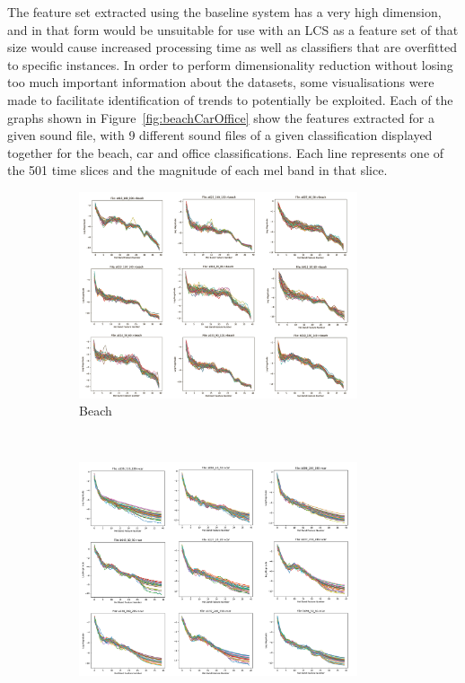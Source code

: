 \documentclass[11pt]{article}
\begin{document}
The feature set extracted using the baseline system has a very high dimension, and in that form would be unsuitable for use with an LCS as a feature set of that size would cause increased processing time as well as classifiers that are overfitted to specific instances. In order to perform dimensionality reduction without losing too much important information about the datasets, some visualisations were made to facilitate identification of trends to potentially be exploited. Each of the graphs shown in Figure~\ref{fig:beachCarOffice} show the features extracted for a given sound file, with 9 different sound files of a given classification displayed together for the beach, car and office classifications. Each line represents one of the 501 time slices and the magnitude of each mel band in that slice. 

\begin{figure}[!htbp]
	\centering
	\begin{subfigure}[t]{0.54\textwidth}
		\centering
		\includegraphics[width=0.9\textwidth]{figures/beachgrid.png}
		\caption{Beach}
	\end{subfigure}
	\\
	\vspace{0.2cm}
	\begin{subfigure}[t]{0.54\textwidth}
		\centering
		\includegraphics[width=0.9\textwidth]{figures/cargrid.png}

\end{subfigure}
\end{figure}
\end{document}
